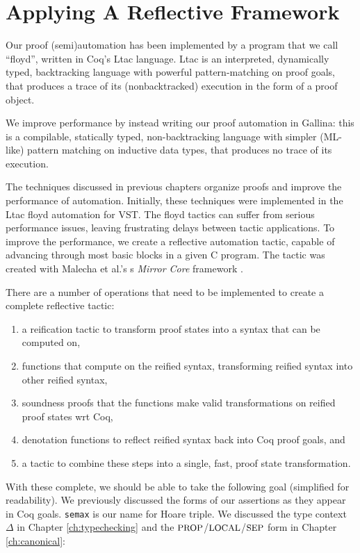 \documentclass{puthesis}
\begin{document}
\chapter{Applying A Reflective Framework}
\label{ch:reflection}


Our proof (semi)automation has been implemented by a program that we
call ``floyd'', written in Coq's Ltac language.  Ltac is an interpreted,
dynamically typed, backtracking language with powerful
pattern-matching on proof goals, that produces a trace of its
(nonbacktracked) execution in the form of a proof object.

We improve performance by instead writing our proof automation in
Gallina: this is a compilable, statically typed, non-backtracking
language with simpler (ML-like) pattern matching on inductive data
types, that produces no trace of its execution.  

The techniques discussed in previous chapters organize proofs and
improve the performance of automation. Initially, these techniques
were implemented in the Ltac floyd automation for VST. The floyd
tactics can suffer from serious performance issues, leaving
frustrating delays between tactic applications. To improve the
performance, we create a reflective automation tactic, capable of
advancing through most basic blocks in a given C program.  The tactic
was created with Malecha et al.'s s \emph{Mirror Core} framework
\cite{malecha:thesis}.

There are a number of operations that need to be implemented to create
a complete reflective tactic: 
\begin{enumerate}
\item a reification tactic to transform proof states into a
  syntax that can be computed on,
\item functions that compute on the reified syntax, transforming
  reified syntax into other reified syntax,
\item soundness proofs that the functions make valid transformations
  on reified proof states wrt Coq,
\item denotation functions to reflect reified syntax back into Coq
  proof goals, and
\item a tactic to combine these steps into a single, fast, proof state
  transformation.
\end{enumerate}

With these complete, we should be able to take the following goal
(simplified for readability).
We previously discussed the forms of our assertions as they appear in
Coq goals. \lstinline|semax| is our name for Hoare triple. We
discussed the type context $\Delta$ in Chapter \ref{ch:typechecking} and the
$\mbox{\small PROP}$/$\mbox{\small LOCAL}$/$\mbox{\small SEP}$ form in Chapter \ref{ch:canonical}:
\end{document}
